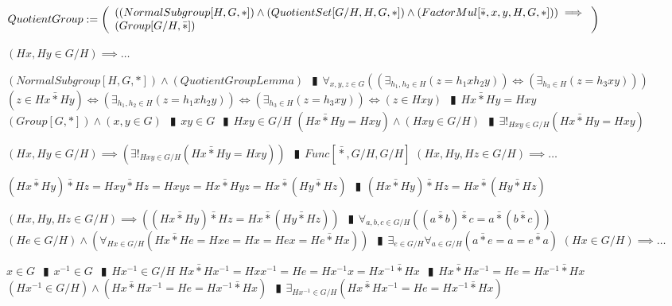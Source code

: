\documentclass{book}
\newcommand{\abr}{:=}
\newcommand{\pipe}{$\phantom{(}\vrectangleblack\phantom{)}$}
\newcommand{\pr}[1]{\left(#1\right)}
\begin{document}
$QuotientGroup \abr \left(\begin{array}{ll}
  \pr{(NormalSubgroup[H, G, *]) \hfill \land \hfill (QuotientSet[G / H, H, G, *]) \hfill \land \hfill (FactorMul[\bar{*}, x, y, H, G, *])} \hfill \implies \hfill \\
  (Group[G / H, \bar{*}])
\end{array}\right)$
\begin{enumerate}
  \lit $(H x, H y \in G / H) \implies \ldots$
  \begin{enumerate}
    \lit $(NormalSubgroup[H, G, *]) \land (QuotientGroupLemma)$ \pipe $\forall_{x, y, z \in G}\pr{\pr{\exists_{h_1, h_2 \in H}(z = h_1 x h_2 y)} \iff \pr{\exists_{h_3 \in H}(z = h_3 x y)}}$
    \lit $(z \in H x \bar{*} H y) \iff \pr{\exists_{h_1, h_2 \in H}(z = h_1 x h_2 y)} \iff \pr{\exists_{h_3 \in H}(z = h_3 x y)} \iff (z \in H x y)$ \pipe $H x \bar{*} H y = H x y$
    \lit $(Group[G, *]) \land (x, y \in G)$ \pipe $x y \in G$ \pipe $H x y \in G / H$
    \lit $(H x \bar{*} H y = H x y) \land (H x y \in G / H)$ \pipe $\exists!_{H x y \in G / H}(H x \bar{*} H y = H x y)$
  \end{enumerate}
  \lit $(H x, H y \in G / H) \implies \pr{\exists!_{H x y \in G / H}(H x \bar{*} H y = H x y)}$ \pipe $Func[\bar{*}, G / H, G / H]$
  \lit $(H x, H y, H z \in G / H) \implies \ldots$
  \begin{enumerate}
    \lit $(H x \bar{*} H y) \bar{*} H z = H x y \bar{*} H z = H x y z = H x \bar{*} H y z = H x \bar{*} (H y \bar{*} H z)$ \pipe $(H x \bar{*} H y) \bar{*} H z = H x \bar{*} (H y \bar{*} H z)$
  \end{enumerate}
  \lit $(H x, H y, H z \in G / H) \implies \pr{(H x \bar{*} H y) \bar{*} H z = H x \bar{*} (H y \bar{*} H z)}$ \pipe $\forall_{a, b, c \in G / H}\pr{(a \bar{*} b) \bar{*} c = a \bar{*} (b \bar{*} c)}$
  \lit $(H e \in G / H) \land \pr{\forall_{H x \in G / H}(H x \bar{*} H e = H x e = H x = H e x = H e \bar{*} H x)}$ \pipe $\exists_{e \in G / H} \forall_{a \in G / H}(a \bar{*} e = a = e \bar{*} a)$
  \lit $(H x \in G / H) \implies \ldots$
  \begin{enumerate}
    \lit $x \in G$ \pipe $x^{-1} \in G$ \pipe $H x^{-1} \in G / H$
    \lit $H x \bar{*} H x^{-1} = H x x^{-1} = H e = H x^{-1} x = H x^{-1} \bar{*} H x$ \pipe $H x \bar{*} H x^{-1} = H e = H x^{-1} \bar{*} H x$
    \lit $(H x^{-1} \in G / H) \land (H x \bar{*} H x^{-1} = H e = H x^{-1} \bar{*} H x)$ \pipe $\exists_{H x^{-1} \in G / H}(H x \bar{*} H x^{-1} = H e = H x^{-1} \bar{*} H x)$
  \end{enumerate}

\end{enumerate}
\end{document}
